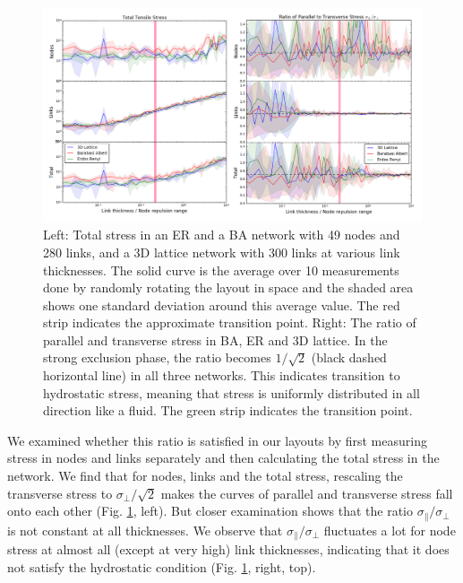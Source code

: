 \documentclass[nofootinbib,preprint,floatfix,endfloats]{revtex4} %
\begin{document}
\begin{figure}
    \centering
    \includegraphics[width=1\columnwidth]{fig-09-19/stress3.png}
    \caption{Left: Total stress in an ER and a BA network with 49 nodes and 280 links, and a 3D lattice network with 300 links at various link thicknesses. 
    The solid curve is the average over 10 measurements done by randomly rotating the layout in space and the  shaded area shows one standard deviation around this average value. 
    The red strip indicates the approximate transition point. %
    Right: The ratio of parallel and transverse stress in BA, ER and 3D lattice. In the strong exclusion phase, the ratio becomes $1/\sqrt{2}$ (black dashed horizontal line) in  all three networks. 
    This indicates transition to hydrostatic stress, meaning that stress is uniformly distributed in all direction like a fluid. 
    The green strip indicates the transition point.}
    \label{fig:stress2}
\end{figure}
We examined whether this ratio is satisfied in our layouts by first measuring stress in nodes and links separately and then calculating the total stress in the network. 
We find that for nodes, links and the total stress, rescaling the transverse stress to $\sigma_\perp/\sqrt{2}$ makes the curves of parallel and transverse stress fall onto each other (Fig. \ref{fig:stress2}, left). 
But closer examination shows that the ratio $\sigma_\parallel/\sigma_\perp$ is not constant at all thicknesses. 
We observe that  $\sigma_\parallel/\sigma_\perp$ fluctuates a lot for node stress at almost all (except at very high) link thicknesses, indicating that it does not satisfy the hydrostatic condition (Fig. \ref{fig:stress2}, right, top).
\end{document}
